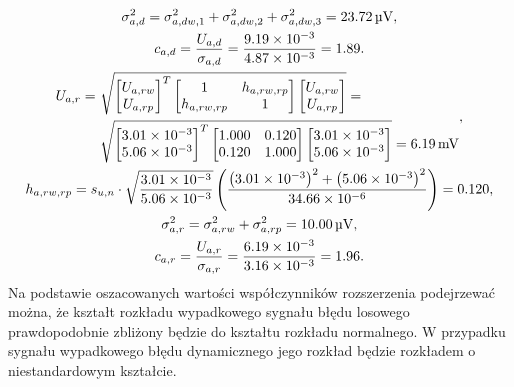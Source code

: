 \begin{gather}
\sigma_{a,d}^{2} = \sigma_{a,dw,1}^{2} + \sigma_{a,dw,2}^{2} + \sigma_{a,dw,3}^{2} = \qty{23.72}{\micro V} \label{eq:sym_parta_var_dyn}, \\
c_{a,d} = \frac{U_{a,d}}{\sigma_{a,d}} = \frac{\num{9.19e-3}}{\num{4.87e-3}} = 1.89 \label{eq:sym_parta_factor_dyn}. \\
\begin{split}
U_{a,r} =~
& \sqrt{
\begin{bmatrix}
U_{a,rw} \\ U_{a,rp}
\end{bmatrix}^{T}
\begin{bmatrix}
1           & h_{a,rw,rp} \\
h_{a,rw,rp} & 1
\end{bmatrix}
\begin{bmatrix}
U_{a,rw} \\ U_{a,rp}
\end{bmatrix}} =~\\
& \sqrt{
\begin{bmatrix}
\num{3.01e-3} \\ \num{5.06e-3}
\end{bmatrix}^{T}
\begin{bmatrix}
1.000 & 0.120 \\
0.120 & 1.000
\end{bmatrix}
\begin{bmatrix}
\num{3.01e-3} \\ \num{5.06e-3}
\end{bmatrix}} = \qty{6.19}{mV}
\end{split}
\label{eq:sym_parta_uncert_rand}, \\
h_{a,rw,rp} = s_{u,n} \cdot \sqrt{\frac{\num{3.01e-3}}{\num{5.06e-3}}} \left( \frac{\left(\num{3.01e-3}\right)^{2} + \left(\num{5.06e-3}\right)^{2}}{\num{34.66e-6}} \right) = 0.120 \label{eq:sym_parta_coher_rw_rp}, \\
\sigma_{a,r}^{2} = \sigma_{a,rw}^{2} + \sigma_{a,rp}^{2} = \qty{10.00}{\micro V} \label{eq:sym_parta_var_rand}, \\
c_{a,r} = \frac{U_{a,r}}{\sigma_{a,r}} = \frac{\num{6.19e-3}}{\num{3.16e-3}} = 1.96 \label{eq:sym_parta_factor_rand}.
\end{gather}
Na podstawie oszacowanych wartości współczynników rozszerzenia podejrzewać można, że kształt rozkładu wypadkowego sygnału błędu losowego prawdopodobnie zbliżony będzie do kształtu rozkładu normalnego. W przypadku sygnału wypadkowego błędu dynamicznego jego rozkład będzie rozkładem o niestandardowym kształcie.

